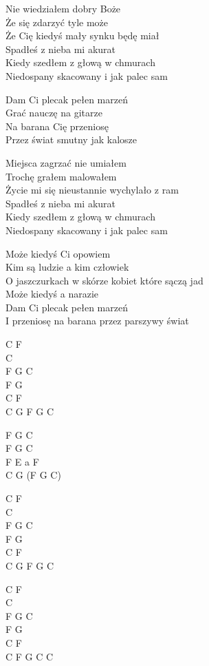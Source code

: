 \begin{text}
    Nie wiedziałem dobry Boże\\
    Że się zdarzyć tyle może\\
    Że Cię kiedyś mały synku będę miał\\
    Spadłeś z nieba mi akurat\\
    Kiedy szedłem z głową w chmurach\\
    Niedospany skacowany i jak palec sam

    \vin Dam Ci plecak pełen marzeń\\
    \vin Grać nauczę na gitarze\\
    \vin Na barana Cię przeniosę\\
    \vin Przez świat smutny jak kalosze

    Miejsca zagrzać nie umiałem\\
    Trochę grałem malowałem\\
    Życie mi się nieustannie wychylało z ram\\
    Spadłeś z nieba mi akurat\\
    Kiedy szedłem z głową w chmurach\\
    Niedospany skacowany i jak palec sam

    Może kiedyś Ci opowiem\\
    Kim są ludzie a kim człowiek\\
    O jaszczurkach w skórze kobiet które sączą jad\\
    Może kiedyś a narazie\\
    Dam Ci plecak pełen marzeń\\
    I przeniosę na barana przez parszywy świat 
\end{text}
\begin{chord}
    C F\\
    C\\
    F G C\\
    F G\\
    C F\\
    C G F G C

    F G C\\
    F G C\\
    F E a F\\
    C G (F G C)

    C F\\
    C\\
    F G C\\
    F G\\
    C F\\
    C G F G C

    C F\\
    C\\
    F G C\\
    F G\\
    C F\\
    C F G C C
\end{chord}